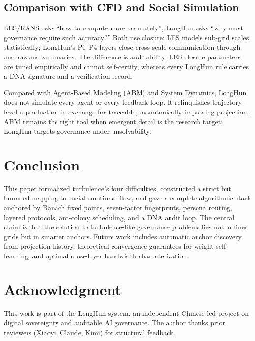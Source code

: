 \documentclass[10pt,a4paper]{article}
\theoremstyle{definition}
\begin{document}
\subsection{Comparison with CFD and Social Simulation}

LES/RANS asks ``how to compute more accurately''; LongHun asks ``why must governance require such accuracy?'' Both use closure: LES models sub-grid scales statistically; LongHun's P0--P4 layers close cross-scale communication through anchors and summaries. The difference is auditability: LES closure parameters are tuned empirically and cannot self-certify, whereas every LongHun rule carries a DNA signature and a verification record.

Compared with Agent-Based Modeling (ABM) and System Dynamics\cite{Epstein1996,Forrester1971}, LongHun does not simulate every agent or every feedback loop. It relinquishes trajectory-level reproduction in exchange for traceable, monotonically improving projection. ABM remains the right tool when emergent detail is the research target; LongHun targets governance under unsolvability.

\section{Conclusion}\label{sec:conclusion}

This paper formalized turbulence's four difficulties, constructed a strict but bounded mapping to social-emotional flow, and gave a complete algorithmic stack anchored by Banach fixed points, seven-factor fingerprints, persona routing, layered protocols, ant-colony scheduling, and a DNA audit loop. The central claim is that the solution to turbulence-like governance problems lies not in finer grids but in smarter anchors. Future work includes automatic anchor discovery from projection history, theoretical convergence guarantees for weight self-learning, and optimal cross-layer bandwidth characterization.

\section*{Acknowledgment}

This work is part of the LongHun system, an independent Chinese-led project on digital sovereignty and auditable AI governance. The author thanks prior reviewers (Xiaoyi, Claude, Kimi) for structural feedback.



\end{document}
